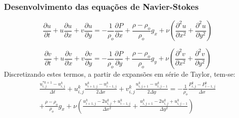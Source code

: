 \documentclass[xcolor=dvipsnames,10pt,aspectratio=169]{beamer}
\begin{document}
	
	\begin{frame}
		\frametitle{Desenvolvimento das equações de Navier-Stokes}
		\centering
		\begin{equation}
			\frac{\partial u}{\partial t} + u\frac{\partial u}{\partial x} + v\frac{\partial u}{\partial y} =  -\frac{1}{\rho_o} \frac{\partial P}{\partial x} + \frac{\rho - 	\rho_o}{\rho_o} g_x + \nu \left( \frac{\partial ^2 u}{\partial x^2} + \frac{\partial ^2 u}{\partial y^2} \right)
		\end{equation}
	
		\begin{equation}
			\frac{\partial v}{\partial t} + u\frac{\partial v}{\partial x} + v\frac{\partial v}{\partial y} =  -\frac{1}{\rho_o} \frac{\partial P}{\partial y} + \frac{\rho - \rho_o}{\rho_o} g_y + \nu \left( \frac{\partial ^2 v}{\partial x^2} + \frac{\partial ^2 v}{\partial y^2} \right)
		\end{equation}
		Discretizando estes termos, a partir de expansões em série de Taylor, tem-se:
		\begin{equation}
			\begin{split}
			\frac{u_{i , j}^{\ast k + 1} - u_{i , j}^{k}}{\Delta t} + u_{i , j}^{k}\frac{u_{i + 1 , j}^k - u_{i - 1 , j}^k  }{2 \Delta x} + v_{i , j}^{k}\frac{u_{i , j+ 1}^k - u_{i, j-1}^k  }{2 \Delta y} =  -\frac{1}{\rho_o} \frac{P_{i, j}^k - P_{i - 1, j}^k}{\Delta x} \\ + \frac{\rho - 	\rho_o}{\rho_o} g_x + \nu \left( \frac{u_{i+1 , j}^k - 2 u_{i,j}^k + u_{i-1,j}^k}{\Delta x^2} + \frac{u_{i , j+1}^k - 2 u_{i,j}^k + u_{i,j-1}^k}{\Delta y^2} \right)
			\end{split}
		\end{equation}
		
	
	\end{frame}
\end{document}
